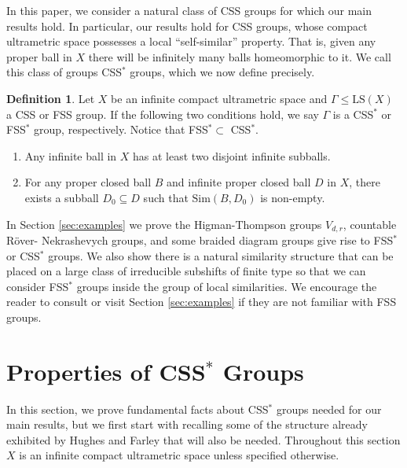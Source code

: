 \documentclass[12pt]{amsart}
\numberwithin{equation}{subsection}
\theoremstyle{definition}
\theoremstyle{definition}
\newtheorem{definition}[theorem]{Definition}
\theoremstyle{remark}
\begin{document}
In this paper, we consider a natural class of CSS groups for which our main results hold. In particular, our results hold for CSS groups, whose compact ultrametric space possesses a local ``self-similar'' property. That is, given any proper ball in $X$ there will be infinitely many balls homeomorphic to it. We call this class of groups CSS$^*$ groups, which we now define precisely. 





\begin{definition}\label{def:CSS*}
    Let $X$ be an infinite compact ultrametric space and $\Gamma \leq \text{LS}(X)$ a CSS or FSS group. If the following two conditions hold, we say  $\Gamma$ is a CSS$^*$ or FSS$^*$ group, respectively. Notice that FSS$^* \subset$ CSS$^*$.
    \begin{enumerate}
        \item Any infinite ball in $X$ has at least two disjoint infinite subballs.
        \item For any proper closed ball $B$ and infinite proper closed ball $D$ in $X$, there exists a subball $D_0 \subseteq D$ such that $\text{Sim}(B,D_0)$ is non-empty.
    \end{enumerate} 
\end{definition}

In Section \ref{sec:examples} we prove the Higman-Thompson groups $V_{d,r}$, countable R\"{o}ver- Nekrashevych groups, and some braided diagram groups give rise to FSS$^*$ or CSS$^*$ groups. We also show there is a natural similarity structure that can be placed on a large class of irreducible subshifts of finite type so that we can consider FSS$^*$ groups inside the group of local similarities. We encourage the reader to consult \cite{hughes2009} or visit Section \ref{sec:examples} if they are not familiar with FSS groups. 




\section{Properties of \texorpdfstring{CSS$^*$}{CSS*} Groups}\label{sec:propofCSS*}

In this section, we prove fundamental facts about CSS$^*$ groups needed for our main results, but we first start with recalling some of the structure already exhibited by Hughes and Farley that will also be needed. Throughout this section $X$ is an infinite compact ultrametric space unless specified otherwise. 
\end{document}
